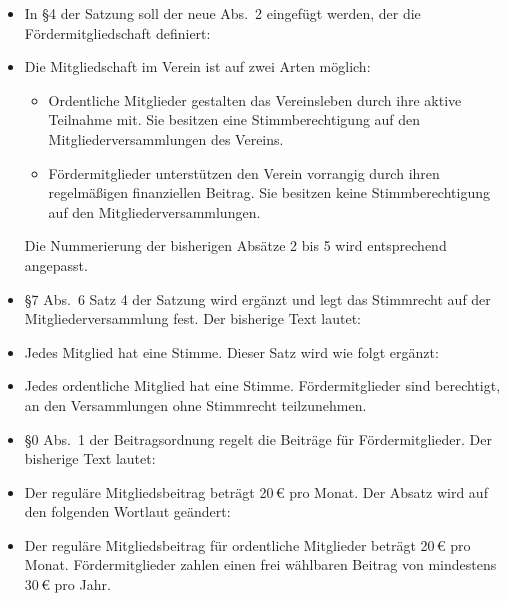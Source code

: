 \documentclass[a4paper,12pt]{scrartcl}
\renewenvironment{quote}{%
  \list{}{\rightmargin\leftmargin}%
    \item\small\itshape\relax%
}{%
  \endlist
}
\begin{document}
\begin{itemize}
  \item In §4 der Satzung soll der neue Abs.~2 eingefügt werden, der die
    Fördermitgliedschaft definiert:
    \begin{quote}
      Die Mitgliedschaft im Verein ist auf zwei Arten möglich:
    \begin{itemize}
      \item Ordentliche Mitglieder gestalten das Vereinsleben durch ihre aktive
        Teilnahme mit. Sie besitzen eine Stimmberechtigung auf den
        Mitgliederversammlungen des Vereins.
      \item Fördermitglieder unterstützen den Verein vorrangig durch ihren
        regelmäßigen finanziellen Beitrag. Sie besitzen keine Stimmberechtigung
        auf den Mitgliederversammlungen. 
    \end{itemize}
    \end{quote}
    Die Nummerierung der bisherigen Absätze 2 bis 5 wird entsprechend angepasst.

  \item §7 Abs.~6 Satz 4 der Satzung wird ergänzt und legt das Stimmrecht auf
    der Mitgliederversammlung fest. Der bisherige Text lautet: 
    \begin{quote}
      Jedes Mitglied hat eine Stimme.
    \end{quote}
    Dieser Satz wird wie folgt ergänzt: 
    \begin{quote}
      Jedes ordentliche Mitglied hat eine Stimme. Fördermitglieder sind
      berechtigt, an den Versammlungen ohne Stimmrecht teilzunehmen.
    \end{quote}

  \item §0 Abs.~1 der Beitragsordnung regelt die Beiträge für Fördermitglieder.
    Der bisherige Text lautet:
    \begin{quote}
      Der reguläre Mitgliedsbeitrag beträgt 20\,€ pro Monat.
    \end{quote}
    Der Absatz wird auf den folgenden Wortlaut geändert:
    \begin{quote}
      Der reguläre Mitgliedsbeitrag für ordentliche Mitglieder beträgt 20\,€
      pro Monat. Fördermitglieder zahlen einen frei wählbaren Beitrag von
      mindestens 30\,€ pro Jahr.
    \end{quote}


\end{itemize}
\end{document}
